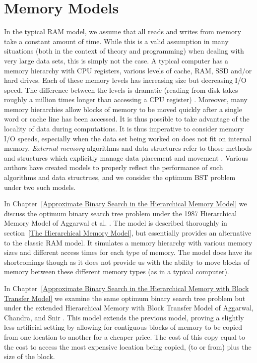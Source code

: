 \documentclass[letterpaper,12pt,titlepage,oneside,final]{book}
\theoremstyle{plain}
\begin{document}
\section{Memory Models}

In the typical RAM model, we assume that all reads and writes from memory take a constant amount of time. While this is a valid assumption in many situations (both in the context of theory and programming) when dealing with very large data sets, this is simply not the case. A typical computer has a memory hierarchy with CPU registers, various levels of cache, RAM, SSD and/or hard drives. Each of these memory levels has increasing size but decreasing I/O speed. The difference between the levels is dramatic (reading from disk takes roughly a million times longer than accessing a CPU register) \cite{vitter2001external}. Moreover, many memory hierarchies allow blocks of memory to be moved quickly after a single word or cache line has been accessed. It is thus possible to take advantage of the locality of data during computations. It is thus imperative to consider memory I/O speeds, especially when the data set being worked on does not fit on internal memory. \textit{External memory} algorithms and data structures refer to those methods and structures which explicitly manage data placement and movement \cite{vitter2001external}. Various authors have created models to properly reflect the performance of such algorithms and data structrues, and we consider the optimum BST problem under two such models.

In Chapter~\ref{Approximate Binary Search in the Hierarchical Memory Model} we discuss the optimum binary search tree problem under the 1987 Hierarchical Memory Model of Aggarwal et al. \cite{aggarwal1987model}. The model is described thoroughly in section~\ref{The Hierarchical Memory Model}, but essentially provides an alternative to the classic RAM model. It simulates a memory hierarchy with various memory sizes and different access times for each type of memory. The model does have its shortcomings though as it does not provide us with the ability to move blocks of memory between these different memory types (as in a typical computer). 

In Chapter~\ref{Approximate Binary Search in the Hierarchical Memory with Block Transfer Model} we examine the same optimum binary search tree problem but under the extended Hierarchical Memory with Block Transfer Model of Aggarwal, Chandra, and Snir \cite{aggarwal1987hierarchical}. This model extends the previous model, proving a slightly less artificial setting by allowing for contiguous blocks of memory to be copied from one location to another for a cheaper price. The cost of this copy equal to the cost to access the most expensive location being copied, (to or from) plus the size of the block. \\
\end{document}
